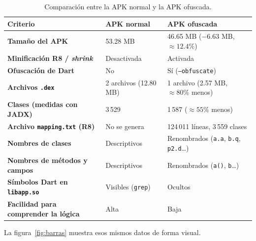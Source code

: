 \documentclass[12pt,letterpaper]{article}
\begin{document}
\begin{table}[h]
\centering
\caption{Comparación entre la APK normal y la APK ofuscada.}
\label{tab:comparativa}
\renewcommand{\arraystretch}{1.35}
\begin{tabularx}{\linewidth}{>{\bfseries}p{4.5cm} X X}
\toprule
Criterio & APK normal & APK ofuscada \\
\midrule
Tamaño del APK & 53.28 MB & 46.65 MB ($-6.63$ MB, $\approx 12.4\%$) \\
Minificación R8 / \emph{shrink} & Desactivada & Activada \\
Ofuscación de Dart & No & Sí (\texttt{--obfuscate}) \\
Archivos \texttt{.dex} & 2 archivos (12.80 MB) & 1 archivo (2.57 MB, $\approx 80\%$ menos) \\
Clases (medidas con JADX) & 3\,529 & 1\,587 ($\approx 55\%$ menos) \\
Archivo \texttt{mapping.txt} (R8) & No se genera & 124\,011 líneas, 3\,559 clases \\
Nombres de clases & Descriptivos & Renombrados (\texttt{a.a}, \texttt{b.q}, \texttt{p2.d}\ldots) \\
Nombres de métodos y campos & Descriptivos & Renombrados (\texttt{a()}, \texttt{b}\ldots) \\
Símbolos Dart en \texttt{libapp.so} & Visibles (\texttt{grep}) & Ocultos \\
Facilidad para comprender la lógica & Alta & Baja \\
\bottomrule
\end{tabularx}
\end{table}

La figura~\ref{fig:barras} muestra esos mismos datos de forma visual.
\end{document}
